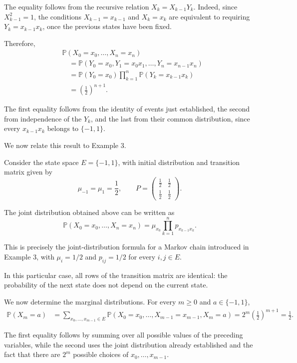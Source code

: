 \documentclass[11pt,a4paper]{article}
\begin{document}
The equality follows from the recursive relation $X_k=X_{k-1}Y_k$. Indeed, since $X_{k-1}^2=1$, the conditions $X_{k-1}=x_{k-1}$ and $X_k=x_k$ are equivalent to requiring $Y_k=x_{k-1}x_k$, once the previous states have been fixed.

Therefore,
\[
\begin{aligned}
&\mathbb P(X_0=x_0,\ldots,X_n=x_n)\\
&\quad=
\mathbb P(Y_0=x_0,Y_1=x_0x_1,\ldots,
Y_n=x_{n-1}x_n)\\
&\quad=
\mathbb P(Y_0=x_0)
\prod_{k=1}^{n}
\mathbb P(Y_k=x_{k-1}x_k)\\
&\quad=
\left(\frac12\right)^{n+1}.
\end{aligned}
\]

The first equality follows from the identity of events just established, the second from independence of the $Y_k$, and the last from their common distribution, since every $x_{k-1}x_k$ belongs to $\{-1,1\}$.

We now relate this result to Example 3.

Consider the state space $E=\{-1,1\}$, with initial distribution and transition matrix given by
\[
\mu_{-1}=\mu_1=\frac12,
\qquad
P=
\begin{pmatrix}
\frac12&\frac12\\
\frac12&\frac12
\end{pmatrix}.
\]

The joint distribution obtained above can be written as
\[
\mathbb P(X_0=x_0,\ldots,X_n=x_n)
=
\mu_{x_0}\prod_{k=1}^{n}p_{x_{k-1}x_k}.
\]

This is precisely the joint-distribution formula for a Markov chain introduced in Example 3, with $\mu_i=1/2$ and $p_{ij}=1/2$ for every $i,j\in E$.

In this particular case, all rows of the transition matrix are identical: the probability of the next state does not depend on the current state.

We now determine the marginal distributions. For every $m\ge0$ and $a\in\{-1,1\}$,
\[
\begin{aligned}
\mathbb P(X_m=a)
&=
\sum_{x_0,\ldots,x_{m-1}\in E}
\mathbb P(X_0=x_0,\ldots,X_{m-1}=x_{m-1},X_m=a) =2^m\left(\frac12\right)^{m+1} =\frac12.
\end{aligned}
\]

The first equality follows by summing over all possible values of the preceding variables, while the second uses the joint distribution already established and the fact that there are $2^m$ possible choices of $x_0,\ldots,x_{m-1}$.
\end{document}
